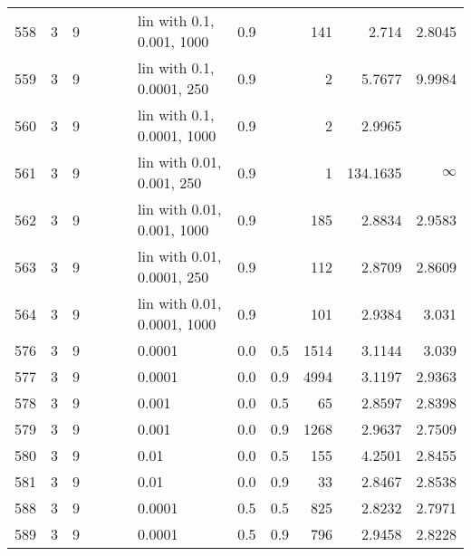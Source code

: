 \begin{longtable}{lrrrrrlrrrrr}
 558 &       3 & 9 &   &   &   &   lin with 0.1, 0.001, 1000 &  0.9 &        &     141 &                  2.714 &                 2.8045 \\
 559 &       3 & 9 &   &   &   &   lin with 0.1, 0.0001, 250 &  0.9 &        &       2 &                 5.7677 &                 9.9984 \\
 560 &       3 & 9 &   &   &   &  lin with 0.1, 0.0001, 1000 &  0.9 &        &       2 &                 2.9965 &                        \\
 561 &       3 & 9 &   &   &   &   lin with 0.01, 0.001, 250 &  0.9 &        &       1 &               134.1635 &               $\infty$ \\
 562 &       3 & 9 &   &   &   &  lin with 0.01, 0.001, 1000 &  0.9 &        &     185 &                 2.8834 &                 2.9583 \\
 563 &       3 & 9 &   &   &   &  lin with 0.01, 0.0001, 250 &  0.9 &        &     112 &                 2.8709 &                 2.8609 \\
 564 &       3 & 9 &   &   &   & lin with 0.01, 0.0001, 1000 &  0.9 &        &     101 &                 2.9384 &                  3.031 \\
 576 &       3 & 9 &   &   &   &                      0.0001 &  0.0 &    0.5 &    1514 &                 3.1144 &                  3.039 \\
 577 &       3 & 9 &   &   &   &                      0.0001 &  0.0 &    0.9 &    4994 &                 3.1197 &                 2.9363 \\
 578 &       3 & 9 &   &   &   &                       0.001 &  0.0 &    0.5 &      65 &                 2.8597 &                 2.8398 \\
 579 &       3 & 9 &   &   &   &                       0.001 &  0.0 &    0.9 &    1268 &                 2.9637 &                 2.7509 \\
 580 &       3 & 9 &   &   &   &                        0.01 &  0.0 &    0.5 &     155 &                 4.2501 &                 2.8455 \\
 581 &       3 & 9 &   &   &   &                        0.01 &  0.0 &    0.9 &      33 &                 2.8467 &                 2.8538 \\
 588 &       3 & 9 &   &   &   &                      0.0001 &  0.5 &    0.5 &     825 &                 2.8232 &                 2.7971 \\
 589 &       3 & 9 &   &   &   &                      0.0001 &  0.5 &    0.9 &     796 &                 2.9458 &                 2.8228 \\

\end{longtable}

